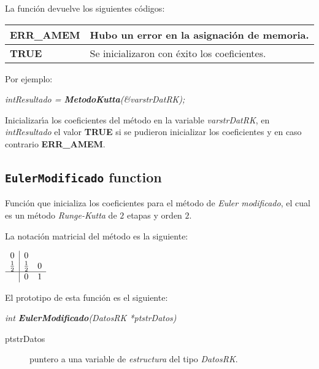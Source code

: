 La funci\'on devuelve los siguientes c\'odigos:

\begin{center}
\begin{tabular}{|l|l|}
\hline
\textbf{ERR\_AMEM} & Hubo un error en la asignaci\'on de memoria. \\
\hline
\textbf{TRUE} & Se inicializaron con \'exito los coeficientes. \\
\hline
\end{tabular}
\end{center}

Por ejemplo:

\begin{center}
\emph{intResultado = \textbf{MetodoKutta}(\&varstrDatRK);}
\end{center}

Inicializar\'{\i}a los coeficientes del m\'etodo en la variable
\emph{varstrDatRK}, en \emph{intResultado} el valor \textbf{TRUE} si se pudieron
inicializar los coeficientes y en caso contrario \textbf{ERR\_AMEM}.

\subsection{\texttt{EulerModificado} function}

Funci\'on que inicializa los coeficientes para el m\'etodo de \emph{Euler 
modificado}, el cual es un m\'etodo \emph{Runge-Kutta} de $2$ etapas y 
orden $2$.\newline

La notaci\'on matricial del m\'etodo es la siguiente:

\begin{center}
$
\begin{array}{c|cc}
0 & 0 \\
\frac{1}{2} & \frac{1}{2} & 0 \\
\hline
 & 0 & 1
\end{array}
$
\end{center}

El prototipo de esta funci\'on es el siguiente:

\begin{center}
\emph{int \textbf{EulerModificado}(DatosRK *ptstrDatos)}
\end{center}

\begin{description}
\item[ptstrDatos] puntero a una variable de \emph{estructura} del tipo
\emph{DatosRK}.
\end{description}

